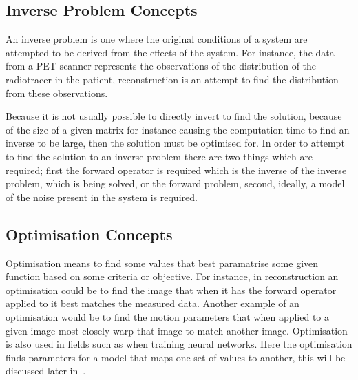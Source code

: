         
        
        \subsection{Inverse Problem Concepts} \label{sec:inverse_problem_concepts}
            An inverse problem is one where the original conditions of a system are attempted to be derived from the effects of the system. For instance, the data from a \gls{PET} scanner represents the observations of the distribution of the radiotracer in the patient, reconstruction is an attempt to find the distribution from these observations.
            
            Because it is not usually possible to directly invert to find the solution, because of the size of a given matrix for instance causing the computation time to find an inverse to be large, then the solution must be optimised for. In order to attempt to find the solution to an inverse problem there are two things which are required; first the forward operator is required which is the inverse of the inverse problem, which is being solved, or the forward problem, %
            second, ideally, a model of the noise present in the system is required. %
        
        \subsection{Optimisation Concepts} \label{sec:optimisation_concepts}
            Optimisation means to find some values that best paramatrise some given function based on some criteria or objective. %
            For instance, in reconstruction an optimisation could be to find the image that when it has the forward operator applied to it best matches the measured data. Another example of an optimisation would be to find the motion parameters that when applied to a given image most closely warp that image to match another image. Optimisation is also used in fields such as when training neural networks. Here the optimisation finds parameters for a model that maps one set of values to another, this will be discussed later in~.
            

